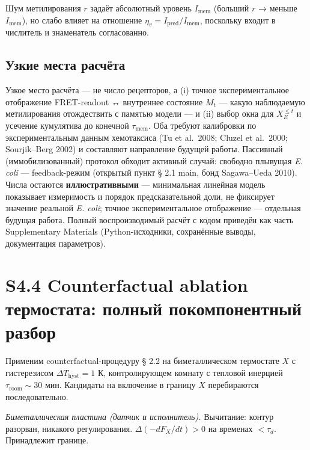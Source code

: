 \documentclass[pdflatex,sn-mathphys-ay]{sn-jnl}
\begin{document}
Шум метилирования \(r\) задаёт абсолютный уровень \(I_{\text{mem}}\) (больший \(r\) → меньше \(I_{\text{mem}}\)), но слабо влияет на отношение \(\eta_v = I_{\text{pred}}/I_{\text{mem}}\), поскольку входит в числитель и знаменатель согласованно.

\subsection*{Узкие места расчёта}\label{ux443ux437ux43aux438ux435-ux43cux435ux441ux442ux430-ux440ux430ux441ux447ux451ux442ux430}

Узкое место расчёта --- не число рецепторов, а (i) точное экспериментальное отображение FRET-readout ↔ внутреннее состояние \(M_t\) --- какую наблюдаемую метилирования отождествить с памятью модели --- и (ii) выбор окна для \(X_E^{\le t}\) и усечение кумулятива до конечной \(\tau_{\text{mem}}\). Оба требуют калибровки по экспериментальным данным хемотаксиса (Tu et al.~2008; Cluzel et al.~2000; Sourjik--Berg 2002) и составляют направление будущей работы. Пассивный (иммобилизованный) протокол обходит активный случай: свободно плывущая \emph{E. coli} --- feedback-режим (открытый пункт § 2.1 main, бонд Sagawa--Ueda 2010). Числа остаются \textbf{иллюстративными} --- минимальная линейная модель показывает измеримость и порядок предсказательной доли, не фиксирует значение реальной \emph{E. coli}; точное экспериментальное отображение --- отдельная будущая работа. Полный воспроизводимый расчёт с кодом приведён как часть Supplementary Materials (Python-исходники, сохранённые выводы, документация параметров).

\section*{S4.4 Counterfactual ablation термостата: полный покомпонентный разбор}\label{s4.4-counterfactual-ablation-ux442ux435ux440ux43cux43eux441ux442ux430ux442ux430-ux43fux43eux43bux43dux44bux439-ux43fux43eux43aux43eux43cux43fux43eux43dux435ux43dux442ux43dux44bux439-ux440ux430ux437ux431ux43eux440}

Применим counterfactual-процедуру § 2.2 на биметаллическом термостате \(X\) с гистерезисом \(\Delta T_{\text{hyst}} = 1\) К, контролирующем комнату с тепловой инерцией \(\tau_{\text{room}} \sim 30\) мин. Кандидаты на включение в границу \(X\) перебираются последовательно.

\emph{Биметаллическая пластина (датчик и исполнитель).} Вычитание: контур разорван, никакого регулирования. \(\Delta(-dF_X/dt) > 0\) на временах \(< \tau_d\). Принадлежит границе.
\end{document}

